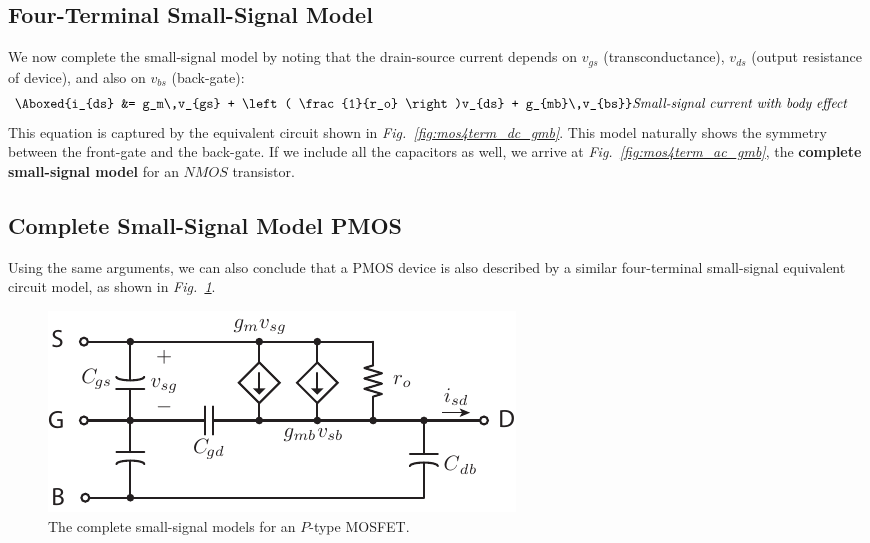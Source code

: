 \subsection{Four-Terminal Small-Signal Model}
We now complete the small-signal model by noting that the drain-source current depends on $v_{gs}$ (transconductance), $v_{ds}$ (output resistance of device), and also on $v_{bs}$ (back-gate):
    \begin{align}
        \Aboxed{i_{ds} &= g_m\,v_{gs} + \left( \frac{1}{r_o} \right)v_{ds} + g_{mb}\,v_{bs}} &\textit{Small-signal current with body effect}
    \end{align}
This equation is captured by the equivalent circuit shown in \emph{Fig.~\ref{fig:mos4term_dc_gmb}}.  This model naturally shows the symmetry between the front-gate and the back-gate.  If we include all the capacitors as well, we arrive at \emph{Fig.~\ref{fig:mos4term_ac_gmb}}, the \textbf{complete small-signal model} for an $NMOS$ transistor.
\subsection{Complete Small-Signal Model PMOS}
Using the same arguments, we can also conclude that a PMOS device is also described by a similar four-terminal small-signal equivalent circuit model, as shown in \emph{Fig.~\ref{fig:pmos4term_ac}}.
\begin{figure}[h]
\centering
\includegraphics[scale=1.05]{pmos4term_ac}
\caption{The complete small-signal models for an $P$-type MOSFET.}
\label{fig:pmos4term_ac}
\end{figure}
